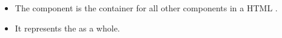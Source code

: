 
\begin{itemize}
\item The   component is the container for all other components in a HTML \gdaut{}.
\item It represents the  \gdaut{} as a whole.
\end{itemize}
